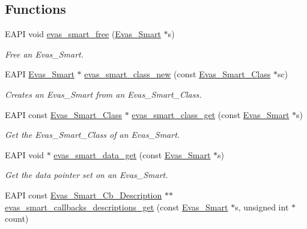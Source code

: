 \subsection*{Functions}
\begin{DoxyCompactItemize}
\item 
EAPI void \hyperlink{group__Evas__Smart__Group_ga3501ae449533ae15eee9cbf65811cad2}{evas\_\-smart\_\-free} (\hyperlink{Evas_8h_a7cdfd1afece1cad64c413eb9a778ddbb}{Evas\_\-Smart} $\ast$s)
\begin{DoxyCompactList}\small\item\em Free an Evas\_\-Smart. \item\end{DoxyCompactList}\item 
EAPI \hyperlink{Evas_8h_a7cdfd1afece1cad64c413eb9a778ddbb}{Evas\_\-Smart} $\ast$ \hyperlink{group__Evas__Smart__Group_ga25a97a07a32a460c8c2d55916481dd1a}{evas\_\-smart\_\-class\_\-new} (const \hyperlink{struct__Evas__Smart__Class}{Evas\_\-Smart\_\-Class} $\ast$sc)
\begin{DoxyCompactList}\small\item\em Creates an Evas\_\-Smart from an Evas\_\-Smart\_\-Class. \item\end{DoxyCompactList}\item 
EAPI const \hyperlink{struct__Evas__Smart__Class}{Evas\_\-Smart\_\-Class} $\ast$ \hyperlink{group__Evas__Smart__Group_gac41799a0e334d515fa8e07313b88c611}{evas\_\-smart\_\-class\_\-get} (const \hyperlink{Evas_8h_a7cdfd1afece1cad64c413eb9a778ddbb}{Evas\_\-Smart} $\ast$s)
\begin{DoxyCompactList}\small\item\em Get the Evas\_\-Smart\_\-Class of an Evas\_\-Smart. \item\end{DoxyCompactList}\item 
EAPI void $\ast$ \hyperlink{group__Evas__Smart__Group_gaa88f3f98a71031573b8dfc4bfeac2f64}{evas\_\-smart\_\-data\_\-get} (const \hyperlink{Evas_8h_a7cdfd1afece1cad64c413eb9a778ddbb}{Evas\_\-Smart} $\ast$s)
\begin{DoxyCompactList}\small\item\em Get the data pointer set on an Evas\_\-Smart. \item\end{DoxyCompactList}\item 
EAPI const \hyperlink{struct__Evas__Smart__Cb__Description}{Evas\_\-Smart\_\-Cb\_\-Description} $\ast$$\ast$ \hyperlink{group__Evas__Smart__Group_ga67ca7d389fd32a2dc4d7d6e29430d900}{evas\_\-smart\_\-callbacks\_\-descriptions\_\-get} (const \hyperlink{Evas_8h_a7cdfd1afece1cad64c413eb9a778ddbb}{Evas\_\-Smart} $\ast$s, unsigned int $\ast$count)
$$
\end{DoxyCompactItemize}
